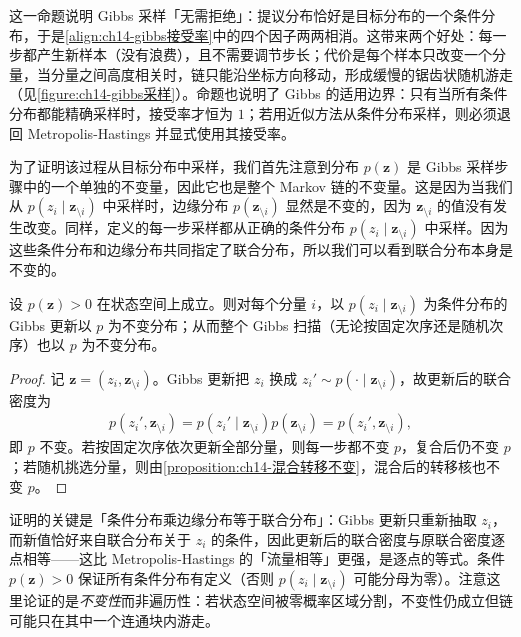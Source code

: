 \documentclass[../../main.tex]{subfiles}
\begin{document}
\begin{remark}这一命题说明 Gibbs 采样「无需拒绝」：提议分布恰好是目标分布的一个条件分布，于是\eqref{align:ch14-gibbs接受率}中的四个因子两两相消。这带来两个好处：每一步都产生新样本（没有浪费），且不需要调节步长；代价是每个样本只改变一个分量，当分量之间高度相关时，链只能沿坐标方向移动，形成缓慢的锯齿状随机游走（见\cref{figure:ch14-gibbs采样}）。命题也说明了 Gibbs 的适用边界：只有当所有条件分布都能精确采样时，接受率才恒为 $1$；若用近似方法从条件分布采样，则必须退回 Metropolis-Hastings 并显式使用其接受率。
\end{remark}

为了证明该过程从目标分布中采样，我们首先注意到分布 $p(\bm{z})$ 是 Gibbs 采样步骤中的一个单独的不变量，因此它也是整个 Markov 链的不变量。这是因为当我们从 $p\!\left(z_{i}\mid\bm{z}_{\setminus i}\right)$ 中采样时，边缘分布 $p\!\left(\bm{z}_{\setminus i}\right)$ 显然是不变的，因为 $\bm{z}_{\setminus i}$ 的值没有发生改变。同样，定义的每一步采样都从正确的条件分布 $p\!\left(z_{i}\mid\bm{z}_{\setminus i}\right)$ 中采样。因为这些条件分布和边缘分布共同指定了联合分布，所以我们可以看到联合分布本身是不变的。

\begin{proposition}\label{proposition:ch14-gibbs不变性}
设 $p(\bm{z})>0$ 在状态空间上成立。则对每个分量 $i$，以 $p\!\left(z_{i}\mid\bm{z}_{\setminus i}\right)$ 为条件分布的 Gibbs 更新以 $p$ 为不变分布；从而整个 Gibbs 扫描（无论按固定次序还是随机次序）也以 $p$ 为不变分布。
\end{proposition}

\begin{proof}
记 $\bm{z}=\left(z_{i},\bm{z}_{\setminus i}\right)$。Gibbs 更新把 $z_{i}$ 换成 $z_{i}'\sim p\!\left(\cdot\mid\bm{z}_{\setminus i}\right)$，故更新后的联合密度为
\begin{align*}
p\!\left(z_{i}',\bm{z}_{\setminus i}\right)=p\!\left(z_{i}'\mid\bm{z}_{\setminus i}\right)p\!\left(\bm{z}_{\setminus i}\right)=p\!\left(z_{i}',\bm{z}_{\setminus i}\right),
\end{align*}
即 $p$ 不变。若按固定次序依次更新全部分量，则每一步都不变 $p$，复合后仍不变 $p$；若随机挑选分量，则由\cref{proposition:ch14-混合转移不变}，混合后的转移核也不变 $p$。
\end{proof}

\begin{remark}证明的关键是「条件分布乘边缘分布等于联合分布」：Gibbs 更新只重新抽取 $z_{i}$，而新值恰好来自联合分布关于 $z_{i}$ 的条件，因此更新后的联合密度与原联合密度逐点相等——这比 Metropolis-Hastings 的「流量相等」更强，是逐点的等式。条件 $p(\bm{z})>0$ 保证所有条件分布有定义（否则 $p\!\left(z_{i}\mid\bm{z}_{\setminus i}\right)$ 可能分母为零）。注意这里论证的是\emph{不变性}而非遍历性：若状态空间被零概率区域分割，不变性仍成立但链可能只在其中一个连通块内游走。
\end{remark}
\end{document}
